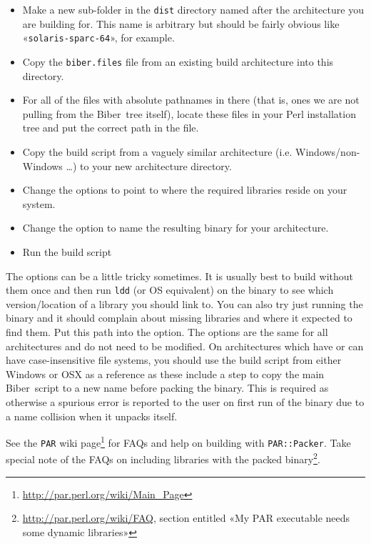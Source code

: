 \documentclass{ltxdockit}
\newcommand*{\biber}{Biber\xspace}
\begin{document}
\begin{itemize}
\item Make a new sub-folder in the \verb+dist+ directory named after the
  architecture you are building for. This name is arbitrary but should
  be fairly obvious like «\verb+solaris-sparc-64+», for example.
\item Copy the \verb+biber.files+ file from an existing build
  architecture into this directory.
\item For all of the files with absolute pathnames in there (that is,
  ones we are not pulling from the \biber\ tree itself), locate these
  files in your Perl installation tree and put the correct path in the
  file.
\item Copy the build script from a vaguely similar architecture
  (i.e. Windows/non-Windows \ldots) to your new architecture
  directory. 
\item Change the  options to point to where the required
  libraries reside on your system.
\item Change the  option to name the resulting binary
  for your architecture.
\item Run the build script
\end{itemize}

\noindent The  options can be a little tricky
sometimes. It is usually best to build without them once and then run
\verb+ldd+ (or OS equivalent) on the binary to see which
version/location of a library you should link to. You can also try
just running the binary and it should complain about missing libraries
and where it expected to find them. Put this path into the
 option. The  options are the same for all
architectures and do not need to be modified.
On architectures which have or can have case-insensitive file systems,
you should use the build script from either Windows or OSX as a reference
as these include a step to copy the main \biber\ script to a new name
before packing the binary. This is required as otherwise a spurious
error is reported to the user on first run of the binary due to a name
collision when it unpacks itself.

See the \verb+PAR+ wiki
page\footnote{\url{http://par.perl.org/wiki/Main_Page}} for FAQs and help
on building with \verb+PAR::Packer+. Take special note of the FAQs on
including libraries with the packed
binary\footnote{\url{http://par.perl.org/wiki/FAQ}, section entitled «My
  PAR executable needs some dynamic libraries»}.
\end{document}
